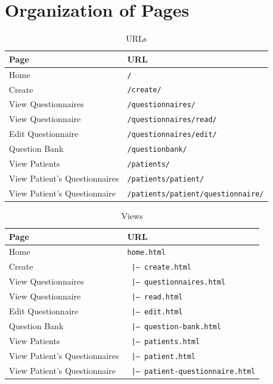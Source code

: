 \documentclass{higrep}
\def\code#1{\texttt{#1}}
\begin{document}
\appendix

\chapter{Organization of Pages}\label{Sec:Org}

\begin{table}[htbp]
  \centering
  \footnotesize\sffamily
  \begin{tabular}{|| l | l ||}
    \hline\hline
    \textbf{Page}  &  \textbf{URL}\\
    \hline
    Home  & \code{/}  \\
    Create  & \code{/create/}  \\
    View Questionnaires  & \code{/questionnaires/}  \\
    View Questionnaire  & \code{/questionnaires/read/}  \\
    Edit Questionnaire  & \code{/questionnaires/edit/}  \\
    Question Bank  & \code{/questionbank/}  \\
    View Patients  & \code{/patients/}  \\
    View Patient's Questionnaires  & \code{/patients/patient/}  \\
    View Patient's Questionnaire  & \code{/patients/patient/questionnaire/}  \\
    \hline\hline
  \end{tabular}
  \caption{URLs} \label{Tab:URLs}
\end{table}

\begin{table}[htbp]
  \centering
  \footnotesize\sffamily
  \begin{tabular}{|| l | l ||}
    \hline\hline
    \textbf{Page}  &  \textbf{URL}\\
    \hline
    Home  & \code{home.html}  \\
    Create  & \code{ |--- create.html}  \\
    View Questionnaires  & \code{ |--- questionnaires.html}  \\
    View Questionnaire  & \code{ \hspace{.5cm} |--- read.html}  \\
    Edit Questionnaire  & \code{ \hspace{.5cm} |--- edit.html}  \\
    Question Bank  & \code{ |--- question-bank.html}  \\
    View Patients  & \code{ |--- patients.html}  \\
    View Patient's Questionnaires  & \code{ \hspace{.5cm}	|--- patient.html}  \\
    View Patient's Questionnaire  & \code{ \hspace{1.4cm}|--- patient-questionnaire.html}  \\
    \hline\hline
  \end{tabular}
  \caption{Views} \label{Tab:Views}
\end{table}
\end{document}

